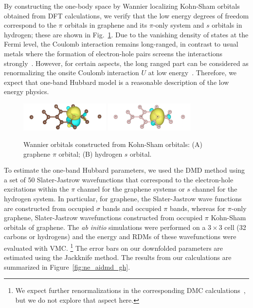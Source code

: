 By constructing the one-body space by Wannier localizing Kohn-Sham orbitals obtained from DFT calculations, 
we verify that the low energy degrees of freedom correspond to the $\pi$ orbitals in graphene and 
its $\pi$-only system and $s$ orbitals in hydrogen; these are shown in Fig.~\ref{fig:honeycomb_wan}. 
Due to the vanishing density of states at the Fermi level, the Coulomb interaction remains long-ranged, 
in contrast to usual metals where the formation of electron-hole pairs screens the interactions strongly~\cite{Zheng2016}. 
However, for certain aspects, the long ranged part can be considered as renormalizing the 
onsite Coulomb interaction $U$ at low energy~\cite{Schuler2013, Changlani2015}. 
Therefore, we expect that one-band Hubbard model is a reasonable description of the low energy physics. 
\begin{figure}[hbt]
\centering
\includegraphics[width=0.40\textwidth]{./Figures/c_pi.png}
\includegraphics[width=0.40\textwidth]{./Figures/h_wan.png}
\caption{Wannier orbitals constructed from Kohn-Sham orbitals: (A) graphene $\pi$ orbital; (B) hydrogen $s$ orbital. }
\label{fig:honeycomb_wan}
\end{figure}

To estimate the one-band Hubbard parameters, we used the DMD method using a set of 50 Slater-Jastrow wavefunctions that correspond 
to the electron-hole excitations within the $\pi$ channel for the graphene systems 
or $s$ channel for the hydrogen system. In particular, for graphene, 
the Slater-Jastrow wave functions are constructed from occupied $\sigma$ bands and occupied $\pi$ bands, whereas for $\pi$-only 
graphene, Slater-Jastrow wavefunctions constructed from occupied $\pi$ Kohn-Sham orbitals of graphene. The \textit{ab initio} simulations 
were performed on a $3\times3$ cell (32 carbons or hydrogens) and the energy and RDMs of these wavefunctions were
evaluated with VMC. \footnote{We expect further renormalizations in the corresponding DMC calculations~\cite{Changlani2015}, 
but we do not explore that aspect here.} The error bars on our downfolded parameters are estimated using the Jackknife method. 
The results from our calculations are summarized in %
Figure~\ref{fig:ne_aidmd_gh}.%

